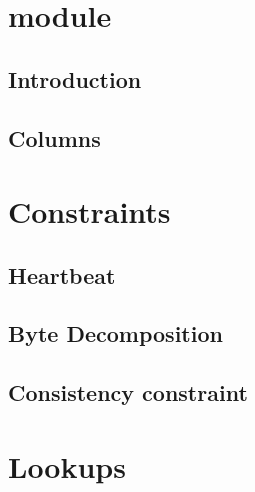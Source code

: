 \section{\blockHashMod{} module}
\subsection{Introduction}                    \label{block hash: intro}               
\subsection{Columns}                         \label{block hash: columns}             

\section{Constraints}
\subsection{Heartbeat}                       \label{block hash: heartbeat}           
\subsection{Byte Decomposition}              \label{block hash: byte decomposition}  
\subsection{Consistency constraint}          \label{block hash: consistency}         

\section{Lookups}                            \label{block hash  lookups}             

